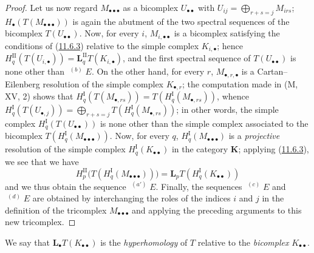 \begin{proof}
Let us now regard $M_{\bullet\bullet\bullet}$ as a bicomplex
$U_{\bullet\bullet}$ with $U_{ij}=\bigoplus_{r+s=j}M_{irs}$;
$H_\bullet(T(M_{\bullet\bullet\bullet}))$ is again the abutment of the two
spectral sequences of the bicomplex $T(U_{\bullet\bullet})$. Now, for every $i$,
$M_{i,\bullet\bullet}$ is a bicomplex satisfying the conditions of
(\hyperref[0.11.6.3]{11.6.3}) relative to the simple complex
$K_{i,\bullet}$; hence
$H_q^{\mathrm{II}}(T(U_{i,\bullet}))=
\mathbf{L}_q^{\mathrm{II}}T(K_{i,\bullet})$, and the first spectral sequence of
$T(U_{\bullet\bullet})$ is none other than $\mathop{}^{(b)}E$. On the other
hand, for every $r$, $M_{\bullet,r,\bullet}$ is a Cartan--Eilenberg resolution
of the simple complex $K_{\bullet,r}$; the computation made in (M, XV, 2)
shows that $H_q^{\mathrm I}(T(M_{\bullet,rs}))=T(H_q^{\mathrm I}(M_{\bullet,rs}))$,
whence $H_q^{\mathrm I}(T(U_{\bullet,j}))=\bigoplus_{r+s=j}T(H_q^{\mathrm I}(M_{\bullet,rs}))$;
in other words, the simple complex
$H_q^{\mathrm I}(T(U_{\bullet\bullet}))$ is none other than the simple complex
associated to the bicomplex
$T(H_q^{\mathrm I}(M_{\bullet\bullet\bullet}))$. Now, for every $q$,
$H_q^{\mathrm I}(M_{\bullet\bullet\bullet})$ is a \emph{projective} resolution of the
simple complex $H_q^{\mathrm I}(K_{\bullet\bullet})$ in the category
$\boldsymbol{K}$; applying (\hyperref[0.11.6.3]{11.6.3}), we see that we have
\[
H_p^{\mathrm{II}}
\bigl(T(H_q^{\mathrm I}(M_{\bullet\bullet\bullet}))\bigr)
=\mathbf{L}_pT(H_q^{\mathrm I}(K_{\bullet\bullet}))
\]
and we thus obtain the sequence $\mathop{}^{(a')}E$. Finally, the sequences
$\mathop{}^{(c)}E$ and $\mathop{}^{(d)}E$ are obtained by interchanging the
roles of the indices $i$ and $j$ in the definition of the tricomplex
$M_{\bullet\bullet\bullet}$ and applying the preceding arguments to this new
tricomplex.
\end{proof}

We say that $\mathbf{L}_\bullet T(K_{\bullet\bullet})$ is the \emph{hyperhomology} of
$T$ relative to the \emph{bicomplex} $K_{\bullet\bullet}$.

